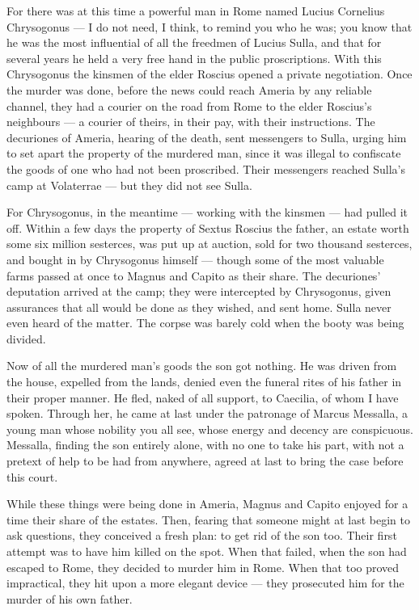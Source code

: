  For there was at this time a powerful man in Rome named Lucius Cornelius Chrysogonus --- I do not need, I think, to remind you who he was; you know that he was the most influential of all the freedmen of Lucius Sulla, and that for several years he held a very free hand in the public proscriptions. With this Chrysogonus the kinsmen of the elder Roscius opened a private negotiation. Once the murder was done, before the news could reach Ameria by any reliable channel, they had a courier on the road from Rome to the elder Roscius's neighbours --- a courier of theirs, in their pay, with their instructions. The decuriones of Ameria, hearing of the death, sent messengers to Sulla, urging him to set apart the property of the murdered man, since it was illegal to confiscate the goods of one who had not been proscribed. Their messengers reached Sulla's camp at Volaterrae --- but they did not see Sulla.

 For Chrysogonus, in the meantime --- working with the kinsmen --- had pulled it off. Within a few days the property of Sextus Roscius the father, an estate worth some six million sesterces, was put up at auction, sold for two thousand sesterces, and bought in by Chrysogonus himself --- though some of the most valuable farms passed at once to Magnus and Capito as their share. The decuriones' deputation arrived at the camp; they were intercepted by Chrysogonus, given assurances that all would be done as they wished, and sent home. Sulla never even heard of the matter. The corpse was barely cold when the booty was being divided.

 Now of all the murdered man's goods the son got nothing. He was driven from the house, expelled from the lands, denied even the funeral rites of his father in their proper manner. He fled, naked of all support, to Caecilia, of whom I have spoken. Through her, he came at last under the patronage of Marcus Messalla, a young man whose nobility you all see, whose energy and decency are conspicuous. Messalla, finding the son entirely alone, with no one to take his part, with not a pretext of help to be had from anywhere, agreed at last to bring the case before this court.

 While these things were being done in Ameria, Magnus and Capito enjoyed for a time their share of the estates. Then, fearing that someone might at last begin to ask questions, they conceived a fresh plan: to get rid of the son too. Their first attempt was to have him killed on the spot. When that failed, when the son had escaped to Rome, they decided to murder him in Rome. When that too proved impractical, they hit upon a more elegant device --- they prosecuted him for the murder of his own father.

